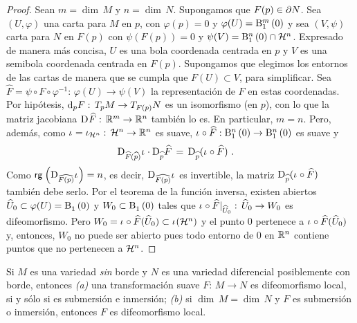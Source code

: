 \begin{proof}
	Sean $m=\dim\,M$ y $n=\dim\,N$.
	Supongamos que $F(p)\in\borde[N]$. Sea $(U,\varphi)$ una carta
	para $M$ en $p$, con $\varphi(p)=0$ y $\varphi(U)=\bola[m]{1}{0}$
	y sea $(V,\psi)$ carta para $N$ en $F(p)$ con $\psi(F(p))=0$
	y $\psi(V)=\bola[n]{1}{0}\cap\hemi[n]$. Expresado de manera
	m\'{a}s concisa, $U$ es una bola coordenada centrada en $p$
	y $V$ es una semibola coordenada centrada en $F(p)$. Supongamos que
	elegimos los entornos de las cartas de manera que se cumpla
	que $F(U)\subset V$, para simplificar. Sea
	$\widehat{F}=\psi\circ F\circ\varphi^{-1}:\,%
	\varphi(U)\rightarrow\psi(V)$ la representaci\'{o}n
	de $F$ en estas coordenadas. Por hip\'{o}tesis,
	$\diferencial[p]{F}:\,T_{p}M\rightarrow T_{F(p)}N$ es un isomorfismo
	(en $p$), con lo que la matriz jacobiana
	$\jacobiana{\widehat{F}}:\,\bb{R}^{m}\rightarrow\bb{R}^{n}$
	tambi\'{e}n lo es. En particular, $m=n$. Pero, adem\'{a}s,
	como $\inc=\inc[{\hemi[n]}]:\,\hemi[n]\rightarrow\bb{R}^{n}$ es suave,
	$\inc\circ \widehat{F}:\bola[n]{1}{0}\rightarrow\bola[n]{1}{0}$ es
	suave y
	\begin{align*}
		\jacobiana[\widehat{F}(\widehat{p})]{\inc}\cdot
			\jacobiana[\widehat{p}]{\widehat{F}} & \,=\,
			\jacobiana[\widehat{p}]{(\inc\circ \widehat{F})}
		\text{ .}
	\end{align*}
	Como $\rango{\jacobiana[\widehat{F(p)}]{\inc}}=n$, es decir,
	$\jacobiana[\widehat{F(p)}]{\inc}$ es invertible,
	la matriz $\jacobiana[\widehat{p}]{(\inc\circ\widehat{F})}$
	tambi\'{e}n debe serlo. Por el teorema de la funci\'{o}n inversa,
	existen abiertos $\widehat{U}_{0}\subset\varphi(U)=\bola{1}{0}$ y
	$W_{0}\subset\bola{1}{0}$ tales que
	$\inc\circ\widehat{F}|_{\widehat{U}_{0}}:\,%
	\widehat{U}_{0}\rightarrow W_{0}$ es difeomorfismo. Pero
	$W_{0}=\inc\circ\widehat{F}(\widehat{U}_{0})\subset\inc(\hemi[n])$
	y el punto $0$ pertenece a $\inc\circ\widehat{F}(\widehat{U}_{0})$ y,
	entonces, $W_{0}$ no puede ser abierto pues todo entorno de $0$ en
	$\bb{R}^{n}$ contiene puntos que no pertenecen a $\hemi[n]$.
\end{proof}

\begin{coroCaeEnElInterior}\label{thm:corocaeenelinterior}
	Si $M$ es una variedad \emph{sin} borde y $N$ es una variedad
	diferencial posiblemente con borde, entonces
	\emph{(a)} una transformaci\'{o}n suave $F:\,M\rightarrow N$ es
	difeomorfismo local, si y s\'{o}lo si es submersi\'{o}n e
	inmersi\'{o}n; \emph{(b)} si $\dim\,M=\dim\,N$ y $F$ es
	submersi\'{o}n o inmersi\'{o}n, entonces $F$ es difeomorfismo local.
\end{coroCaeEnElInterior}

